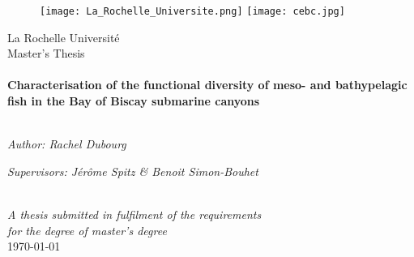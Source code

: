 \begin{titlepage}

\begin{figure}[ht]
			\texttt{[image: La\_Rochelle\_Universite.png]}
			\label{logoLR}
	   \endminipage
			\texttt{[image: cebc.jpg]}
			\label{logocebc}
		\endminipage
	\end{figure}


\begin{center}

{\LARGE La Rochelle Université}\\[1.5cm] %
{\Large Master's Thesis}\\[0.5cm] %

\HRule \\[0.4cm] %
{\huge \bfseries Characterisation of the functional diversity of meso- and bathypelagic fish in the Bay of Biscay submarine canyons }\\[0.4cm] %
\HRule \\[1.5cm] %

\begin{minipage}{0.4\textwidth}
\begin{flushleft} \large
\emph{Author: Rachel Dubourg}\\
\end{flushleft}
\end{minipage}
\begin{minipage}{0.4\textwidth}
\begin{flushright} \large
\emph{Supervisors: Jérôme Spitz \& Benoit Simon-Bouhet} \\
\end{flushright}
\end{minipage}\\[3cm]

\large \textit{A thesis submitted in fulfilment of the requirements\\ for the degree of master's degree}\\[0.3cm] %

{\large \today}\\[4cm]

            
\end{center}
\end{titlepage}